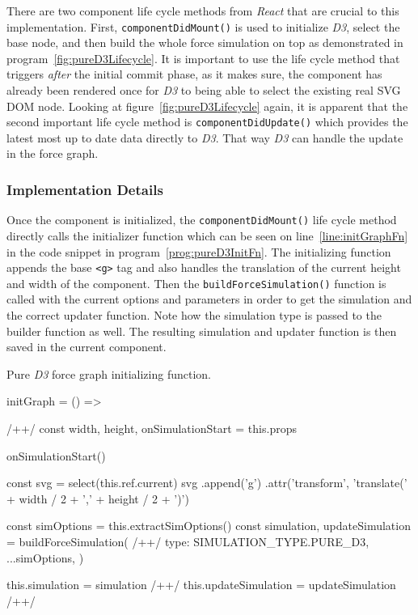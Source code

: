 There are two component life cycle methods from \emph{React} that are crucial to this implementation. First, \texttt{componentDidMount()} is used to initialize \emph{D3}, select the base node, and then build the whole force simulation on top as demonstrated in program~\ref{fig:pureD3Lifecycle}. It is important to use the life cycle method that triggers \emph{after} the initial commit phase, as it makes sure, the component has already been rendered once for \emph{D3} to being able to select the existing real SVG DOM node. Looking at figure~\ref{fig:pureD3Lifecycle} again, it is apparent that the second important life cycle method is \texttt{componentDidUpdate()} which provides the latest most up to date data directly to \emph{D3}. That way \emph{D3} can handle the update in the force graph.

\subsubsection{Implementation Details}

Once the component is initialized, the \texttt{componentDidMount()} life cycle method directly calls the initializer function which can be seen on line~\ref{line:initGraphFn} in the code snippet in program~\ref{prog:pureD3InitFn}. The initializing function appends the base \texttt{<g>} tag and also handles the translation of the current height and width of the component. Then the \texttt{build\-Force\-Simulation()} function is called with the current options and parameters in order to get the simulation and the correct updater function. Note how the simulation type is passed to the builder function as well. The resulting simulation and updater function is then saved in the current component.

\begin{program}
\caption{Pure \emph{D3} force graph initializing function.}
\label{prog:pureD3InitFn}
\begin{JsCode}
initGraph = () => { /+\label{line:initGraphFn}+/
  const { width, height, onSimulationStart } = this.props

  onSimulationStart()

  const svg = select(this.ref.current)
  svg
    .append('g')
    .attr('transform', 'translate(' + width / 2 + ',' + height / 2 + ')')

  const simOptions = this.extractSimOptions()
  const { simulation, updateSimulation } = buildForceSimulation({ /+\label{line:buildForceSimulation}+/
    type: SIMULATION_TYPE.PURE_D3,
    ...simOptions,
  })

  this.simulation = simulation /+\label{line:thisContext1}+/
  this.updateSimulation = updateSimulation /+\label{line:thisContext2}+/
}
\end{JsCode}
\end{program}

